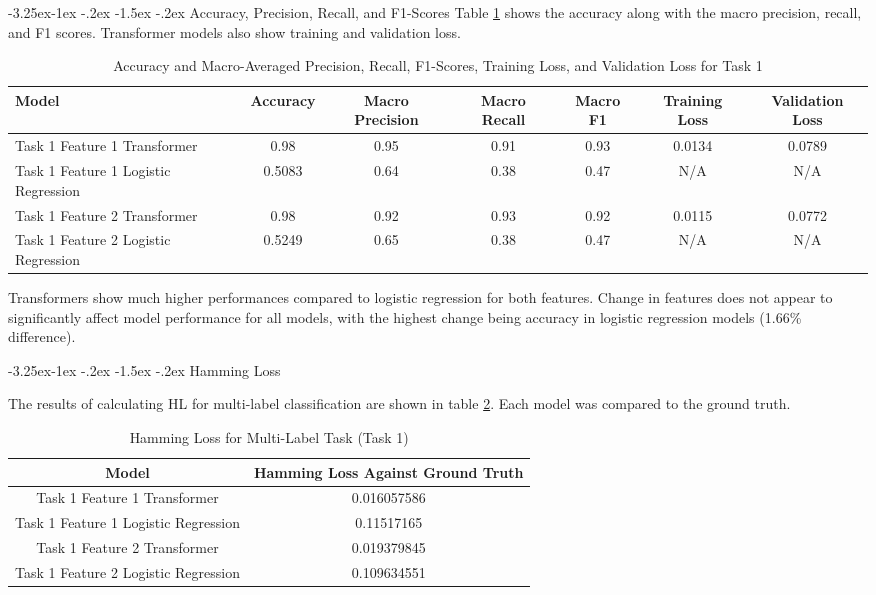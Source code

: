 \documentclass[10.7pt, onecolumn]{article}
\makeatletter
\renewcommand\subsubsection{\@startsection{subsubsection}{3}{\z@}%
	{-3.25ex\@plus -1ex \@minus -.2ex}%
    {-1.5ex \@plus -.2ex}%
    {\normalfont\itshape}}
\makeatother
\begin{document}
\subsubsection{Accuracy, Precision, Recall, and F1-Scores}
Table \ref{tab:task1accEtc} shows the accuracy along with the macro precision, recall, and F1 scores. Transformer models also show training and validation loss.
\begin{table}[h]
  \small
  \centering
  \setlength{\tabcolsep}{4pt}
  \begin{tabular}{|p{3cm}|c|c|c|c|c|c|}
    \hline
    \textbf{Model} & \textbf{Accuracy} & \textbf{Macro Precision} & \textbf{Macro Recall} & \textbf{Macro F1}  & \textbf{Training Loss} & \textbf{Validation Loss}\\
    \hline
    Task 1 Feature 1 Transformer & 0.98  & 0.95  & 0.91  & 0.93 & 0.0134 & 0.0789 \\
    \hline
    Task 1 Feature 1 Logistic Regression & 0.5083 & 0.64  & 0.38  & 0.47 &N/A &N/A \\
    \hline
    Task 1 Feature 2 Transformer & 0.98  & 0.92  & 0.93  & 0.92 &0.0115 &0.0772 \\
    \hline
    Task 1 Feature 2 Logistic Regression & 0.5249 & 0.65  & 0.38  & 0.47 &N/A &N/A \\
    \hline
  \end{tabular}
  \caption{Accuracy and Macro-Averaged Precision, Recall, F1-Scores, Training Loss, and Validation Loss for Task 1}
  \label{tab:task1accEtc}
\end{table}

Transformers show much higher performances compared to logistic regression for both features. Change in features does not appear to significantly affect model performance for all models, with the highest change being accuracy in logistic regression models (1.66\% difference).

\subsubsection{Hamming Loss}

The results of calculating HL for multi-label classification are shown in table \ref{tab:hammingL}. Each model was compared to the ground truth.

\begin{table}[h!]
  \centering
  \begin{tabular}{|c|c|}
      \hline
      \textbf{Model} & \textbf{Hamming Loss Against Ground Truth} \\ \hline
      Task 1 Feature 1 Transformer & 0.016057586 \\ \hline
      Task 1 Feature 1 Logistic Regression      & 0.11517165  \\ \hline
      Task 1 Feature 2 Transformer & 0.019379845 \\ \hline
      Task 1 Feature 2 Logistic Regression      & 0.109634551 \\ \hline
  \end{tabular}
  \caption{Hamming Loss for Multi-Label Task (Task 1)}
  \label{tab:hammingL}
\end{table}
\end{document}

